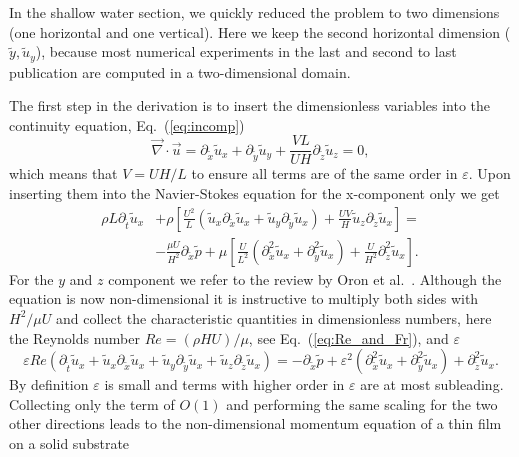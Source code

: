 In the shallow water section, we quickly reduced the problem to two dimensions (one horizontal and one vertical).
Here we keep the second horizontal dimension ($\tilde{y}, \tilde{u}_y$), because most numerical experiments in the last and second to last publication are computed in a two-dimensional domain. 
 
The first step in the derivation is to insert the dimensionless variables into the continuity equation, Eq.~(\ref{eq:incomp})
\begin{equation}\label{eq:cont_thin_film_1}
     \vec{\nabla}\cdot\vec{u} = \partial_{\tilde{x}} \tilde{u}_x + \partial_{\tilde{y}} \tilde{u}_y + \frac{V L}{U H}\partial_{\tilde{z}} \tilde{u}_z = 0,
\end{equation}
which means that $V = U H/L$ to ensure all terms are of the same order in $\varepsilon$.
Upon inserting them into the Navier-Stokes equation for the x-component only we get
\begin{align}
     \rho L \partial_{\tilde{t}}\tilde{u}_x &+ \rho\left[\frac{U^2}{L}\left(\tilde{u}_x\partial_{\tilde{x}}\tilde{u}_x + \tilde{u}_y\partial_{\tilde{y}}\tilde{u}_x\right) + \frac{U V}{H}\tilde{u}_z\partial_{\tilde{z}}\tilde{u}_x\right] = \nonumber \\ &-\frac{\mu U}{H^2} \partial_{\tilde{x}} \tilde{p} + \mu\left[\frac{U}{L^2}(\partial^2_{\tilde{x}}\tilde{u}_x + \partial^2_{\tilde{y}}\tilde{u}_x) + \frac{U}{H^2}\partial^2_{\tilde{z}}\tilde{u}_x\right].
\end{align}
For the $y$ and $z$ component we refer to the review by Oron et al.~\cite{oronLongscaleEvolutionThin1997}.
Although the equation is now non-dimensional it is instructive to multiply both sides with $H^2/\mu U$ and collect the characteristic quantities in dimensionless numbers, here the Reynolds number $Re = (\rho H U)/\mu$, see Eq.~(\ref{eq:Re_and_Fr}), and $\varepsilon$  
\begin{equation}
    \varepsilon Re \left(\partial_{\tilde{t}}\tilde{u}_x + \tilde{u}_x\partial_{\tilde{x}}\tilde{u}_x + \tilde{u}_y\partial_{\tilde{y}}\tilde{u}_x + \tilde{u}_z\partial_{\tilde{z}}\tilde{u}_x \right) = -\partial_{\tilde{x}}\tilde{p} + \varepsilon^2\left(\partial^2_{\tilde{x}}\tilde{u}_x + \partial^2_{\tilde{y}}\tilde{u}_x\right) + \partial^2_{\tilde{z}}\tilde{u}_x. 
\end{equation}
By definition $\varepsilon$ is small and terms with higher order in $\varepsilon$ are at most subleading.
Collecting only the term of $O(1)$ and performing the same scaling for the two other directions leads to the non-dimensional momentum equation of a thin film on a solid substrate

